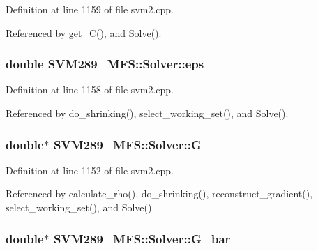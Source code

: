 Definition at line 1159 of file svm2.\+cpp.



Referenced by get\+\_\+\+C(), and Solve().

\subsubsection[{\texorpdfstring{eps}{eps}}]{\setlength{\rightskip}{0pt plus 5cm}double S\+V\+M289\+\_\+\+M\+F\+S\+::\+Solver\+::eps\hspace{0.3cm}{\ttfamily [protected]}}\hypertarget{class_s_v_m289___m_f_s_1_1_solver_afc19fe2ebf0ad2239f9f1c6db2d85c12}{}\label{class_s_v_m289___m_f_s_1_1_solver_afc19fe2ebf0ad2239f9f1c6db2d85c12}


Definition at line 1158 of file svm2.\+cpp.



Referenced by do\+\_\+shrinking(), select\+\_\+working\+\_\+set(), and Solve().

\subsubsection[{\texorpdfstring{G}{G}}]{\setlength{\rightskip}{0pt plus 5cm}double$\ast$ S\+V\+M289\+\_\+\+M\+F\+S\+::\+Solver\+::G\hspace{0.3cm}{\ttfamily [protected]}}\hypertarget{class_s_v_m289___m_f_s_1_1_solver_a96465496d62f5c9566275270d7a54a4f}{}\label{class_s_v_m289___m_f_s_1_1_solver_a96465496d62f5c9566275270d7a54a4f}


Definition at line 1152 of file svm2.\+cpp.



Referenced by calculate\+\_\+rho(), do\+\_\+shrinking(), reconstruct\+\_\+gradient(), select\+\_\+working\+\_\+set(), and Solve().

\subsubsection[{\texorpdfstring{G\+\_\+bar}{G_bar}}]{\setlength{\rightskip}{0pt plus 5cm}double$\ast$ S\+V\+M289\+\_\+\+M\+F\+S\+::\+Solver\+::\+G\+\_\+bar\hspace{0.3cm}{\ttfamily [protected]}}\hypertarget{class_s_v_m289___m_f_s_1_1_solver_a384cdc6a8882e17f0b78a817d570c5f7}{}\label{class_s_v_m289___m_f_s_1_1_solver_a384cdc6a8882e17f0b78a817d570c5f7}


